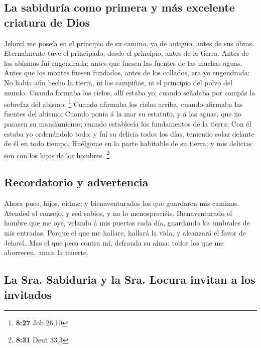 \hypertarget{la-sabiduruxeda-como-primera-y-muxe1s-excelente-criatura-de-dios}{%
\subsection{La sabiduría como primera y más excelente criatura de
Dios}\label{la-sabiduruxeda-como-primera-y-muxe1s-excelente-criatura-de-dios}}

 Jehová me poseía en el principio de su camino, ya de
antiguo, antes de sus obras.  Eternalmente tuve el
principado, desde el principio, antes de la tierra. 
Antes de los abismos fuí engendrada; antes que fuesen las fuentes de las
muchas aguas.  Antes que los montes fuesen fundados,
antes de los collados, era yo engendrada:  No había aún
hecho la tierra, ni las campiñas, ni el principio del polvo del mundo.
 Cuando formaba los cielos, allí estaba yo; cuando
señalaba por compás la sobrefaz del abismo; \footnote{\textbf{8:27} Job
  26,10}  Cuando afirmaba los cielos arriba, cuando
afirmaba las fuentes del abismo;  Cuando ponía á la mar
su estatuto, y á las aguas, que no pasasen su mandamiento; cuando
establecía los fundamentos de la tierra;  Con él estaba
yo ordenándolo todo; y fuí su delicia todos los días, teniendo solaz
delante de él en todo tiempo.  Huélgome en la parte
habitable de su tierra; y mis delicias son con los hijos de los hombres.
\footnote{\textbf{8:31} Deut 33,3}

\hypertarget{recordatorio-y-advertencia}{%
\subsection{Recordatorio y
advertencia}\label{recordatorio-y-advertencia}}

 Ahora pues, hijos, oidme; y bienaventurados los que
guardaren mis caminos.  Atended el consejo, y sed sabios,
y no lo menospreciéis.  Bienaventurado el hombre que me
oye, velando á mis puertas cada día, guardando los umbrales de mis
entradas.  Porque el que me hallare, hallará la vida, y
alcanzará el favor de Jehová.  Mas el que peca contra mí,
defrauda su alma: todos los que me aborrecen, aman la muerte.

\hypertarget{la-sra.-sabiduria-y-la-sra.-locura-invitan-a-los-invitados}{%
\subsection{La Sra. Sabiduria y la Sra. Locura invitan a los
invitados}\label{la-sra.-sabiduria-y-la-sra.-locura-invitan-a-los-invitados}}

